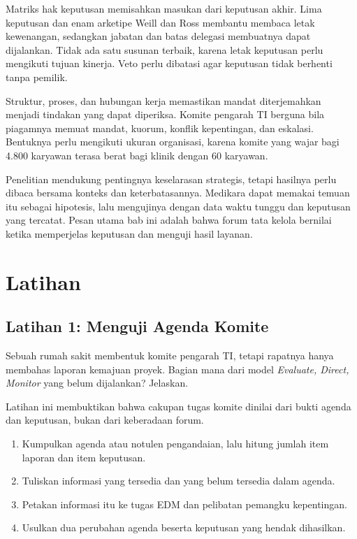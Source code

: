 Matriks hak keputusan memisahkan masukan dari keputusan akhir. Lima keputusan dan enam arketipe Weill
dan Ross membantu membaca letak kewenangan, sedangkan jabatan dan batas delegasi membuatnya dapat
dijalankan. Tidak ada satu susunan terbaik, karena letak keputusan perlu mengikuti tujuan kinerja.
Veto perlu dibatasi agar keputusan tidak berhenti tanpa pemilik.

Struktur, proses, dan hubungan kerja memastikan mandat diterjemahkan menjadi tindakan yang dapat
diperiksa. Komite pengarah TI berguna bila piagamnya memuat mandat, kuorum, konflik kepentingan, dan
eskalasi. Bentuknya perlu mengikuti ukuran organisasi, karena komite yang wajar bagi 4.800 karyawan
terasa berat bagi klinik dengan 60 karyawan.

Penelitian mendukung pentingnya keselarasan strategis, tetapi hasilnya perlu dibaca bersama konteks dan
keterbatasannya. Medikara dapat memakai temuan itu sebagai hipotesis, lalu mengujinya dengan data waktu
tunggu dan keputusan yang tercatat. Pesan utama bab ini adalah bahwa forum tata kelola bernilai ketika
memperjelas keputusan dan menguji hasil layanan.

\section{Latihan}

\subsection*{Latihan 1: Menguji Agenda Komite}

Sebuah rumah sakit membentuk komite pengarah TI, tetapi rapatnya hanya membahas laporan kemajuan
proyek. Bagian mana dari model \textit{Evaluate, Direct, Monitor} yang belum dijalankan? Jelaskan.

Latihan ini membuktikan bahwa cakupan tugas komite dinilai dari bukti agenda dan keputusan, bukan dari
keberadaan forum.
\begin{enumerate}
  \item Kumpulkan agenda atau notulen pengandaian, lalu hitung jumlah item laporan dan item keputusan.
  \item Tuliskan informasi yang tersedia dan yang belum tersedia dalam agenda.
  \item Petakan informasi itu ke tugas EDM dan pelibatan pemangku kepentingan.
  \item Usulkan dua perubahan agenda beserta keputusan yang hendak dihasilkan.
\end{enumerate}

